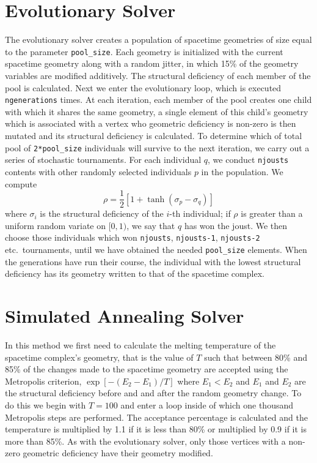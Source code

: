 \documentclass[12pt,letterpaper]{report}
\begin{document}
\section{Evolutionary Solver}

The evolutionary solver creates a population of spacetime geometries of size equal to the parameter 
\texttt{pool\_size}. Each geometry is initialized with the current spacetime geometry along with a random 
jitter, in which 15\% of the geometry variables are modified additively. The structural deficiency 
of each member of the pool is calculated. Next we enter the evolutionary loop, which is executed 
\texttt{ngenerations} times. At each iteration, each member of the pool creates one child with which it 
shares the same geometry, a single element of this child's geometry which is associated with a vertex 
who geometric deficiency is non-zero is then mutated and its structural deficiency is calculated. To 
determine which of total pool of \texttt{2*pool\_size} individuals will survive to the next iteration, 
we carry out a series of stochastic tournaments. For each individual $q$, we conduct \texttt{njousts} 
contents with other randomly selected individuals $p$ in the population. We compute 
\begin{equation*}
\rho = \frac {1}{2}\left[1 + \tanh(\sigma_p - \sigma_q)\right]
\end{equation*}
where $\sigma_i$ is the structural deficiency of the $i$-th individual; if $\rho$ is greater than a 
uniform random variate on $[0,1)$, we say that $q$ has won the joust. We then choose those individuals 
which won \texttt{njousts}, \texttt{njousts-1}, \texttt{njousts-2} etc.\ tournaments, until we have 
obtained the needed \texttt{pool\_size} elements. When the generations have run their course, the 
individual with the lowest structural deficiency has its geometry written to that of the spacetime 
complex.
  
\section{Simulated Annealing Solver}

In this method we first need to calculate the melting temperature of the spacetime complex's geometry, 
that is the value of $T$ such that between 80\% and 85\% of the changes made to the spacetime geometry 
are accepted using the Metropolis criterion, $\exp[-(E_2 - E_1)/T]$ where $E_1 < E_2$ and $E_1$ and 
$E_2$ are the structural deficiency before and and after the random geometry change. To do this we 
begin with $T=100$ and enter a loop inside of which one thousand Metropolis steps are performed. The 
acceptance percentage is calculated and the temperature is multiplied by 1.1 if it is less than 80\% 
or multiplied by 0.9 if it is more than 85\%. As with the evolutionary solver, only those vertices 
with a non-zero geometric deficiency have their geometry modified.   
\end{document}
